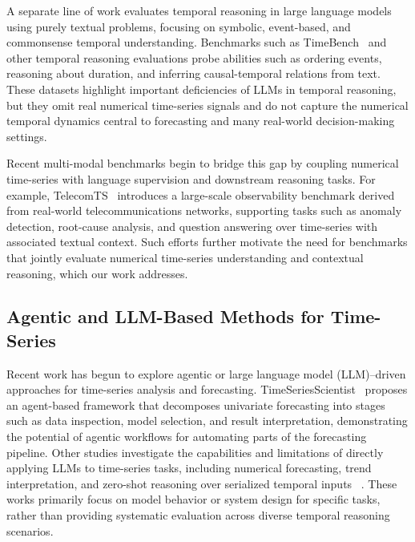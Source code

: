 A separate line of work evaluates temporal reasoning in large language models using purely textual problems, focusing on symbolic, event-based, and commonsense temporal understanding.
Benchmarks such as TimeBench~\cite{chu2024timebench} and other temporal reasoning evaluations probe abilities such as ordering events, reasoning about duration, and inferring causal-temporal relations from text.
These datasets highlight important deficiencies of LLMs in temporal reasoning, but they omit real numerical time-series signals and do not capture the numerical temporal dynamics central to forecasting and many real-world decision-making settings.

Recent multi-modal benchmarks begin to bridge this gap by coupling numerical time-series with language supervision and downstream reasoning tasks.
For example, TelecomTS~\cite{feng2025telecomts} introduces a large-scale observability benchmark derived from real-world telecommunications networks, supporting tasks such as anomaly detection, root-cause analysis, and question answering over time-series with associated textual context.
Such efforts further motivate the need for benchmarks that jointly evaluate numerical time-series understanding and contextual reasoning, which our work addresses.


\subsection{Agentic and LLM-Based Methods for Time-Series}

Recent work has begun to explore agentic or large language model (LLM)–driven approaches for time-series analysis and forecasting.
TimeSeriesScientist~\cite{zhao2025timeseriesscientist} proposes an agent-based framework that decomposes univariate forecasting into stages such as data inspection, model selection, and result interpretation, demonstrating the potential of agentic workflows for automating parts of the forecasting pipeline.
Other studies investigate the capabilities and limitations of directly applying LLMs to time-series tasks, including numerical forecasting, trend interpretation, and zero-shot reasoning over serialized temporal inputs~\cite{jin2024whatcanllm} .
These works primarily focus on model behavior or system design for specific tasks, rather than providing systematic evaluation across diverse temporal reasoning scenarios.

